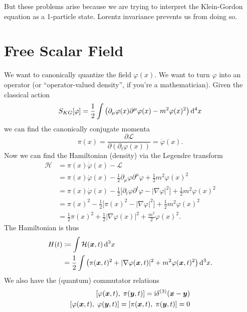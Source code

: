 But these problems arise because we are trying to interpret the
Klein-Gordon equation as a 1-particle state. Lorentz invariance prevents
us from doing so.

\section{Free Scalar Field} %

\M
We want to canonically quantize the field $\varphi(x)$. We want to turn
$\varphi$ into an operator (or ``operator-valued density'', if you're a
mathematician). Given the classical action
\begin{equation}
\action_{KG}[\varphi]=\frac{1}{2}\int\left(\partial_{\mu}\varphi(x)%
\partial^{\mu}\varphi(x)-m^{2}\varphi(x)^{2}\right)\D^{4}x
\end{equation}
we can find the canonically conjugate momenta
\begin{equation}
\pi(x)=\frac{\partial\mathcal{L}}{\partial(\partial_{t}\varphi(x))}=\dot{\varphi}(x).
\end{equation}
Now we can find the Hamiltonian (density) via the Legendre transform
\begin{subequations}
\begin{align}
\mathcal{H}
&=\pi(x)\dot\varphi(x) - \mathcal{L}\\
&=\pi(x)\dot{\varphi}(x)
   -\frac{1}{2}\partial_{\mu}\varphi\partial^{\mu}\varphi
   +\frac{1}{2}m^{2}\varphi(x)^{2}\\
&=\pi(x)\dot{\varphi}(x)
  - \frac{1}{2}\bigl[\partial_{t}\varphi\partial^{t}\varphi-|\nabla\varphi|^{2}\bigr]
  + \frac{1}{2}m^{2}\varphi(x)^{2}\\
&=\pi(x)^{2}
  - \frac{1}{2}\bigl[\pi(x)^{2}-|\nabla\varphi|^{2}\bigr]
  + \frac{1}{2}m^{2}\varphi(x)^{2}\\
&=\frac{1}{2}\pi(x)^{2}
  +\frac{1}{2}|\nabla\varphi(x)|^{2}
  +\frac{m^{2}}{2}\varphi(x)^{2}.
\end{align}
\end{subequations}
The Hamiltonian is thus
\begin{equation}
\begin{split}
H(t) &\eqDef\int\mathcal{H}(\vec{x},t)\,\D^{3}x\\
&=\frac{1}{2}\int\left(\pi(\vec{x},t)^{2}+|\nabla\varphi(\vec{x},t)|^{2}+m^{2}\varphi(\vec{x},t)^{2}\right)\D^{3}x.
\end{split}
\end{equation}
We also have the (quantum) commutator relations
\begin{equation}
\begin{split}
\commutator{\varphi(\vec{x},t)}{\pi(\vec{y},t)}=\I\delta^{(3)}(\vec{x}-\vec{y})\\
\commutator{\varphi(\vec{x},t)}{\varphi(\vec{y},t)}=
\commutator{\pi(\vec{x},t)}{\pi(\vec{y},t)}=0
\end{split}
\end{equation}


